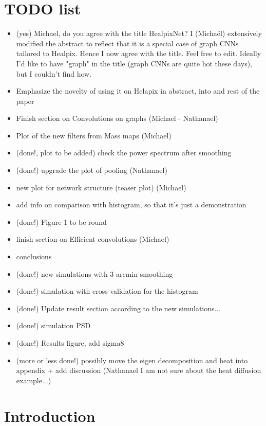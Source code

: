 \documentclass[final,twocolumn,3p,times,authoryear]{elsarticle}
\newcommand{\1}{\b{1}}              %
\newcommand{\0}{\b{0}}              %
\begin{document}
\section{TODO list}
\begin{itemize}
	\item (yes) Michael, do you agree with the title HealpixNet? I (Michaël) extensively modified the abstract to reflect that it is a special case of graph CNNs tailored to Healpix. Hence I now agree with the title. Feel free to edit. Ideally I'd like to have "graph" in the title (graph CNNs are quite hot these days), but I couldn't find how.
    \item Emphasize the novelty of using it on Helapix in abstract, into and rest of the paper
    \item Finish section on Convolutions on graphs (Michael - Nathanael)
    \item Plot of the new filters from Mass maps (Michael)
    \item (done!, plot to be added) check the power spectrum after smoothing
    \item (done!) upgrade the plot of pooling (Nathanael)
    \item new plot for network structure (teaser plot) (Michael)
    \item add info on comparison with histogram, so that it's just a demonstration
    \item (done!) Figure 1 to be round
    \item finish section on Efficient convolutions (Michael)
    \item conclusions
    \item (done!) new simulations with 3 arcmin smoothing
    \item (done!) simulation with cross-validation for the histogram
    \item (done!) Update result section according to the new simulations...
    \item (done!) simulation PSD
    \item (done!) Results figure, add sigma8
    \item (more or less done!) possibly move the eigen decomposition and heat into appendix + add discussion (Nathanael I am not sure about the heat diffusion example...)
\end{itemize}

\section{Introduction}
\label{sec:intro}
\end{document}
